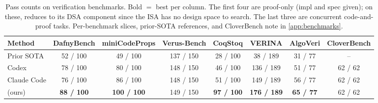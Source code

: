 \begin{table}[t]
\centering
\footnotesize
\setlength{\tabcolsep}{5pt}
\renewcommand{\arraystretch}{1.05}
\caption{Pass counts on verification benchmarks. Bold $=$ best per column. The first four are proof-only (impl and spec given); on these, \sys{} reduces to its DSA component since the ISA has no design space to search. The last three are concurrent code-and-proof tasks. Per-benchmark slices, prior-SOTA references, and CloverBench note in \cref{app:benchmarks}.}
\label{tab:bench-results}
\begin{tabular}{lccccccc}
\toprule
Method & DafnyBench & miniCodeProps & Verus-Bench & CoqStoq & VERINA & AlgoVeri & CloverBench \\
\midrule
Prior SOTA            & 52 / 100 & 49 / 100  & 137 / 150 & 28 / 100 & 38 / 189  & 31 / 77 & -- \\
Codex                 & 78 / 100 & 80 / 100  & 148 / 150 & 46 / 100 & 136 / 189 & 51 / 77 & 62 / 62 \\
Claude Code           & 76 / 100 & 86 / 100  & 148 / 150 & 51 / 100 & 149 / 189 & 56 / 77 & 62 / 62 \\
\midrule
\textbf{\sys{}} (ours) & \textbf{88 / 100} & \textbf{100 / 100} & 149 / 150 & \textbf{97 / 100} & \textbf{176 / 189} & \textbf{65 / 77} & 62 / 62 \\
\bottomrule
\end{tabular}
\end{table}
